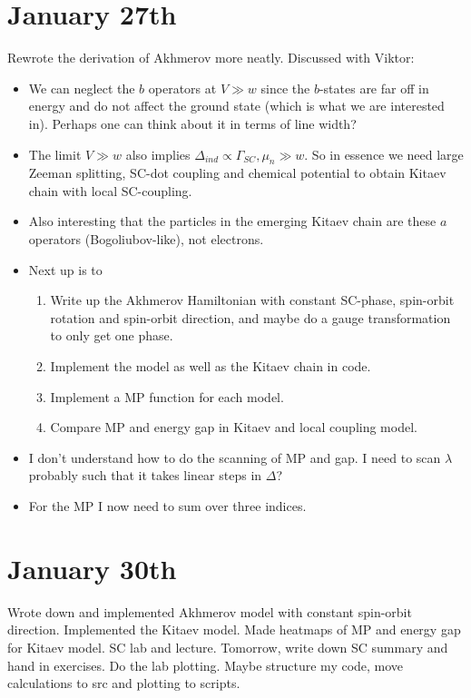 \documentclass{article}
\begin{document}
\section*{January 27th}
Rewrote the derivation of Akhmerov more neatly. Discussed with Viktor:
\begin{itemize}
    \item We can neglect the $b$ operators at $V\gg w$ since the $b$-states are far off in energy and do not affect the ground state (which is what we are interested in). Perhaps one can think about it in terms of line width?
    \item The limit $V \gg w$ also implies $\Delta_{ind}\propto \Gamma_{SC}, \mu_n \gg w$. So in essence we need large Zeeman splitting, SC-dot coupling and chemical potential to obtain Kitaev chain with local SC-coupling.
    \item Also interesting that the particles in the emerging Kitaev chain are these $a$ operators (Bogoliubov-like), not electrons.
    \item Next up is to
        \begin{enumerate}
            \item Write up the Akhmerov Hamiltonian with constant SC-phase, spin-orbit rotation and spin-orbit direction, and maybe do a gauge transformation to only get one phase.
            \item Implement the model as well as the Kitaev chain in code.
            \item Implement a MP function for each model.
            \item Compare MP and energy gap in Kitaev and local coupling model.
        \end{enumerate}
    \item I don't understand how to do the scanning of MP and gap. I need to scan $\lambda$ probably such that it takes linear steps in $\Delta$?
    \item For the MP I now need to sum over three indices.
\end{itemize}
\section*{January 30th}
Wrote down and implemented Akhmerov model with constant spin-orbit direction. Implemented the Kitaev model. Made heatmaps of MP and energy gap for Kitaev model. SC lab and lecture. Tomorrow, write down SC summary and hand in exercises. Do the lab plotting. Maybe structure my code, move calculations to src and plotting to scripts.
\end{document}
